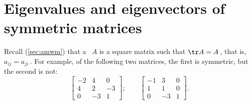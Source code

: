 
\chapter{Eigenvalues and eigenvectors of symmetric matrices}
\label{ch:eesm}

\minitoc


Recall (\autoref{sec:amwm}) that a ~\(A\) is a square matrix such that \(\tr A=A\)\,, that is, \(a_{ij}=a_{ji}\)\,.
For example, of the following two matrices, the first is symmetric, but the second is not:
\begin{equation*}
\begin{bmatrix} -2&4&0
\\4&2&-3
\\0&-3&1 \end{bmatrix};\qquad
\begin{bmatrix} -1&3&0
\\1&1&0
\\0&-3&1 \end{bmatrix}.
\end{equation*}

